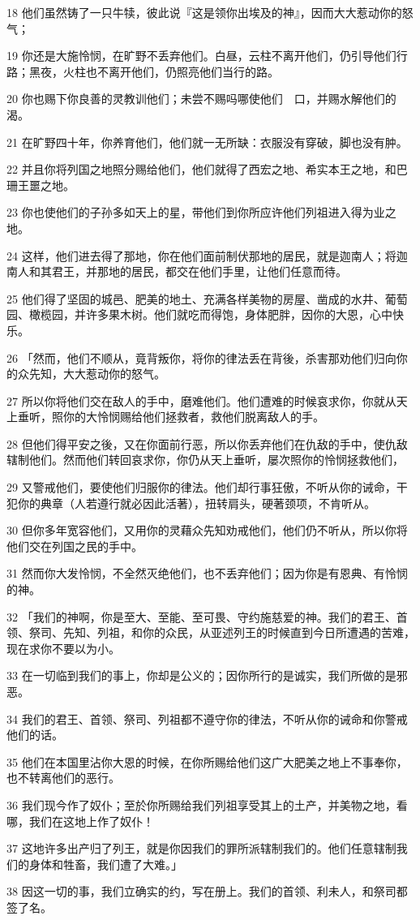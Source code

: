 \par 18 他们虽然铸了一只牛犊，彼此说『这是领你出埃及的神』，因而大大惹动你的怒气；
\par 19 你还是大施怜悯，在旷野不丢弃他们。白昼，云柱不离开他们，仍引导他们行路；黑夜，火柱也不离开他们，仍照亮他们当行的路。
\par 20 你也赐下你良善的灵教训他们；未尝不赐吗哪使他们　口，并赐水解他们的渴。
\par 21 在旷野四十年，你养育他们，他们就一无所缺：衣服没有穿破，脚也没有肿。
\par 22 并且你将列国之地照分赐给他们，他们就得了西宏之地、希实本王之地，和巴珊王噩之地。
\par 23 你也使他们的子孙多如天上的星，带他们到你所应许他们列祖进入得为业之地。
\par 24 这样，他们进去得了那地，你在他们面前制伏那地的居民，就是迦南人；将迦南人和其君王，并那地的居民，都交在他们手里，让他们任意而待。
\par 25 他们得了坚固的城邑、肥美的地土、充满各样美物的房屋、凿成的水井、葡萄园、橄榄园，并许多果木树。他们就吃而得饱，身体肥胖，因你的大恩，心中快乐。
\par 26 「然而，他们不顺从，竟背叛你，将你的律法丢在背後，杀害那劝他们归向你的众先知，大大惹动你的怒气。
\par 27 所以你将他们交在敌人的手中，磨难他们。他们遭难的时候哀求你，你就从天上垂听，照你的大怜悯赐给他们拯救者，救他们脱离敌人的手。
\par 28 但他们得平安之後，又在你面前行恶，所以你丢弃他们在仇敌的手中，使仇敌辖制他们。然而他们转回哀求你，你仍从天上垂听，屡次照你的怜悯拯救他们，
\par 29 又警戒他们，要使他们归服你的律法。他们却行事狂傲，不听从你的诫命，干犯你的典章（人若遵行就必因此活著），扭转肩头，硬著颈项，不肯听从。
\par 30 但你多年宽容他们，又用你的灵藉众先知劝戒他们，他们仍不听从，所以你将他们交在列国之民的手中。
\par 31 然而你大发怜悯，不全然灭绝他们，也不丢弃他们；因为你是有恩典、有怜悯的神。
\par 32 「我们的神啊，你是至大、至能、至可畏、守约施慈爱的神。我们的君王、首领、祭司、先知、列祖，和你的众民，从亚述列王的时候直到今日所遭遇的苦难，现在求你不要以为小。
\par 33 在一切临到我们的事上，你却是公义的；因你所行的是诚实，我们所做的是邪恶。
\par 34 我们的君王、首领、祭司、列祖都不遵守你的律法，不听从你的诫命和你警戒他们的话。
\par 35 他们在本国里沾你大恩的时候，在你所赐给他们这广大肥美之地上不事奉你，也不转离他们的恶行。
\par 36 我们现今作了奴仆；至於你所赐给我们列祖享受其上的土产，并美物之地，看哪，我们在这地上作了奴仆！
\par 37 这地许多出产归了列王，就是你因我们的罪所派辖制我们的。他们任意辖制我们的身体和牲畜，我们遭了大难。」
\par 38 因这一切的事，我们立确实的约，写在册上。我们的首领、利未人，和祭司都签了名。

